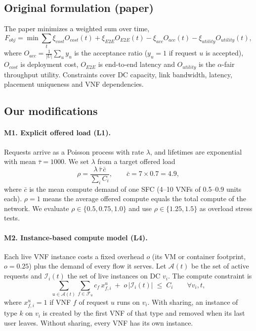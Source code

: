 \documentclass[11pt,a4paper]{article}
\begin{document}
\subsection{Original formulation (paper)}
The paper minimizes a weighted sum over time,
\begin{equation}
F_{obj} = \min \sum_{t} \xi_{cost} O_{cost}(t) + \xi_{E2E} O_{E2E}(t)
 - \xi_{acc} O_{acc}(t) - \xi_{utility} O_{utility}(t),
\end{equation}
where $O_{acc}=\frac{1}{|U|}\sum_u y_u$ is the acceptance ratio ($y_u=1$ if
request $u$ is accepted), $O_{cost}$ is deployment cost, $O_{E2E}$ is end-to-end
latency and $O_{utility}$ is the $\alpha$-fair throughput utility. Constraints
cover DC capacity, link bandwidth, latency, placement uniqueness and VNF
dependencies.

\subsection{Our modifications}

\paragraph{M1. Explicit offered load (L1).} Requests arrive as a Poisson process
with rate $\lambda$, and lifetimes are exponential with mean $\bar\tau=1000$. We
set $\lambda$ from a target offered load
\begin{equation}
\rho = \frac{\lambda\,\bar\tau\,\bar c}{\sum_{i} C_i},
\qquad \bar c = 7\times 0.7 = 4.9,
\end{equation}
where $\bar c$ is the mean compute demand of one SFC (4--10 VNFs of
0.5--0.9 units each). $\rho=1$ means the average offered compute equals the
total compute of the network. We evaluate $\rho\in\{0.5, 0.75, 1.0\}$ and use
$\rho\in\{1.25, 1.5\}$ as overload stress tests.

\paragraph{M2. Instance-based compute model (L4).} Each live VNF instance costs a
fixed overhead $o$ (its VM or container footprint, $o=0.25$) plus the demand of
every flow it serves. Let $\mathcal{A}(t)$ be the set of active requests and
$\mathcal{I}_i(t)$ the set of live instances on DC $v_i$. The compute
constraint is
\begin{equation}
\sum_{u\in\mathcal{A}(t)} \sum_{f\in\mathcal{F}_u} c_f\, x^u_{f,i}
\;+\; o\,|\mathcal{I}_i(t)| \;\le\; C_i \qquad \forall v_i, t,
\end{equation}
where $x^u_{f,i}=1$ if VNF $f$ of request $u$ runs on $v_i$. With sharing, an
instance of type $k$ on $v_i$ is created by the first VNF of that type and
removed when its last user leaves. Without sharing, every VNF has its own
instance.
\end{document}
